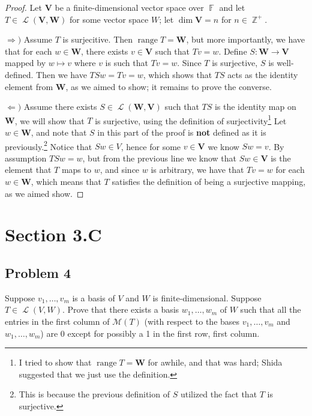 \documentclass[letterpaper, 12pt]{amsart}
\DeclareMathOperator{\Z}{\mathbb{Z}}
\DeclareMathOperator{\F}{\mathbb{F}}
\DeclareMathOperator{\range}{\text{range }}
\DeclareMathOperator{\Ell}{\mathscr{L}}
\theoremstyle{definition}  %
\newcommand{\Ra}{\Rightarrow}                   %
\newcommand{\La}{\Leftarrow}                    %
\begin{document}
		\begin{proof}
		Let $\mathbf{V}$ be a finite-dimensional vector space over $\F$ and let $T \in \Ell(\mathbf{V},\mathbf{W})$ for some vector space $W$; let $\dim \mathbf{V} = n$ for $n \in \Z^{+}$.

		$\Ra)$ Assume $T$ is surjecitive.
		Then $\range T = \mathbf{W}$, but more importantly, we have that for each $w \in \mathbf{W}$, there exists $v \in \mathbf{V}$ such that $Tv = w$.
		Define $S : \mathbf{W} \to \mathbf{V}$ mapped by $w \mapsto v$ where $v$ is such that $Tv = w$.
		Since $T$ is surjective, $S$ is well-defined.
		Then we have $TSw = Tv = w$, which shows that $TS$ acts as the identity element from $\mathbf{W}$, as we aimed to show; it remains to prove the converse.

		$\La)$ Assume there exists $S \in \Ell(\mathbf{W},\mathbf{V})$ such that $TS$ is the identity map on $\mathbf{W}$, we will show that $T$ is surjective, using the definition of surjectivity\footnote{I tried to show that $\range T = \textbf{W}$ for awhile, and that was hard; Shida suggested that we just use the definition.}
		Let $w \in \mathbf{W}$, and note that $S$ in this part of the proof is \textbf{not} defined as it is previously.\footnote{This is because the previous definition of $S$ utilized the fact that $T$ is surjective.}
		Notice that $Sw \in V$, hence for some $v \in \mathbf{V}$ we know $Sw = v$.
		By assumption $TSw = w$, but from the previous line we know that $Sw \in \mathbf{V}$ is the element that $T$ maps to $w$, and since $w$ is arbitrary, we have that $Tv = w$ for each $w \in \mathbf{W}$, which means that $T$ satisfies the definition of being a surjective mapping, as we aimed show.
		\end{proof}

	\section*{Section 3.C}
		\subsection*{Problem 4}
		Suppose $v_{1}, \dots, v_{m}$ is a basis of $V$ and $W$ is finite-dimensional. 
		Suppose $T \in \Ell(V,W)$. 
		Prove that there exists a basis $w_{1}, \dots, w_{m}$ of $W$ such that all the entries in the first column of $\mathcal{M}(T)$ (with respect to the bases $v_{1}, \dots, v_{m}$ and $w_{1}, \dots, w_{m}$) are 0 except for possibly a 1 in the first row, first column.
\end{document}
